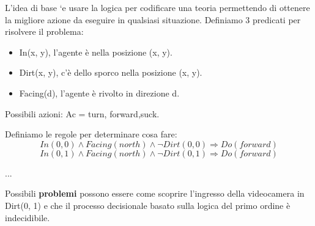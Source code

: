 L’idea di base `e usare la logica per codificare una teoria permettendo di ottenere la migliore azione da eseguire in qualsiasi situazione.
Definiamo 3 predicati per risolvere il problema:
\begin{itemize}
    \item In(x, y), l’agente è nella posizione (x, y).
    \item Dirt(x, y), c'è dello sporco nella posizione (x, y).
    \item Facing(d), l’agente è rivolto in direzione d.
\end{itemize}
Possibili azioni: Ac = {turn, forward,suck}.
\newpage

Definiamo le regole per determinare cosa fare:
\begin{displaymath}
    In(0, 0) \land Facing(north) \land \lnot Dirt(0, 0) \Rightarrow Do(forward)
\end{displaymath}
\begin{displaymath}
    In(0, 1) \land Facing(north) \land \lnot Dirt(0, 1) \Rightarrow Do(forward)
\end{displaymath}
\begin{center}
    ...
\end{center}

Possibili \textbf{problemi} possono essere come scoprire l'ingresso della videocamera in Dirt(0, 1) e che il processo decisionale basato sulla logica del primo ordine è indecidibile.